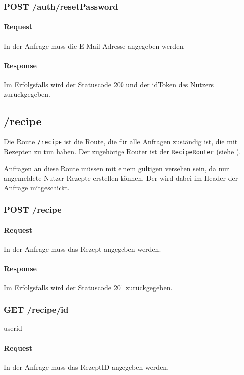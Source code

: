 \documentclass{entwurfsheft}
\begin{document}
\subsubsection*{POST /auth/resetPassword}
    \paragraph{Request}
        In der Anfrage muss die E-Mail-Adresse angegeben werden.
    \paragraph{Response}
        Im Erfolgsfalls wird der Statuscode 200 und der idToken des Nutzers zurückgegeben. 

\subsection{/recipe}
Die Route \texttt{/recipe} ist die Route, die für alle Anfragen zuständig ist, die mit Rezepten zu tun haben.
Der zugehörige Router ist der \texttt{RecipeRouter} (siehe ).

Anfragen an diese Route müssen mit einem gültigen  versehen sein, da nur angemeldete Nutzer Rezepte erstellen können.
Der  wird dabei im Header der Anfrage mitgeschickt.

\subsubsection*{POST /recipe}
    \paragraph{Request}
        In der Anfrage muss das Rezept angegeben werden.
    \paragraph{Response}
        Im Erfolgsfalls wird der Statuscode 201 zurückgegeben.

\subsubsection*{GET /recipe/id} userid
    \paragraph{Request}
        In der Anfrage muss das RezeptID angegeben werden.
\end{document}
